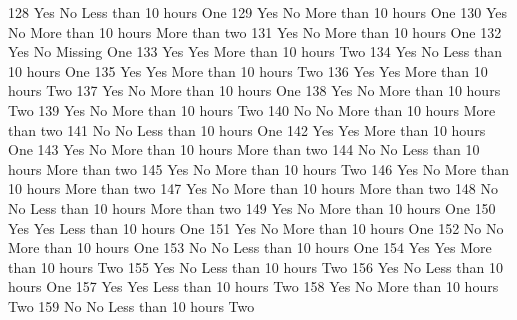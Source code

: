 \documentclass[
  letterpaper,
  DIV=11,
  numbers=noendperiod]{scrreprt}
\newenvironment{Shaded}{\begin{snugshade}}{\end{snugshade}}
\newcommand{\NormalTok}[1]{\textcolor[rgb]{0.00,0.23,0.31}{#1}}
\begin{document}
\begin{Shaded}
\begin{Highlighting}[]
\NormalTok{128               Yes             No Less than 10 hours           One}
\NormalTok{129               Yes             No More than 10 hours           One}
\NormalTok{130               Yes             No More than 10 hours More than two}
\NormalTok{131               Yes             No More than 10 hours           One}
\NormalTok{132               Yes             No            Missing           One}
\NormalTok{133               Yes            Yes More than 10 hours           Two}
\NormalTok{134               Yes             No Less than 10 hours           One}
\NormalTok{135               Yes            Yes More than 10 hours           Two}
\NormalTok{136               Yes            Yes More than 10 hours           Two}
\NormalTok{137               Yes             No More than 10 hours           One}
\NormalTok{138               Yes             No More than 10 hours           Two}
\NormalTok{139               Yes             No More than 10 hours           Two}
\NormalTok{140                No             No More than 10 hours More than two}
\NormalTok{141                No             No Less than 10 hours           One}
\NormalTok{142               Yes            Yes More than 10 hours           One}
\NormalTok{143               Yes             No More than 10 hours More than two}
\NormalTok{144                No             No Less than 10 hours More than two}
\NormalTok{145               Yes             No More than 10 hours           Two}
\NormalTok{146               Yes             No More than 10 hours More than two}
\NormalTok{147               Yes             No More than 10 hours More than two}
\NormalTok{148                No             No Less than 10 hours More than two}
\NormalTok{149               Yes             No More than 10 hours           One}
\NormalTok{150               Yes            Yes Less than 10 hours           One}
\NormalTok{151               Yes             No More than 10 hours           One}
\NormalTok{152                No             No More than 10 hours           One}
\NormalTok{153                No             No Less than 10 hours           One}
\NormalTok{154               Yes            Yes More than 10 hours           Two}
\NormalTok{155               Yes             No Less than 10 hours           Two}
\NormalTok{156               Yes             No Less than 10 hours           One}
\NormalTok{157               Yes            Yes Less than 10 hours           Two}
\NormalTok{158               Yes             No More than 10 hours           Two}
\NormalTok{159                No             No Less than 10 hours           Two}

\end{Highlighting}
\end{Shaded}
\end{document}
